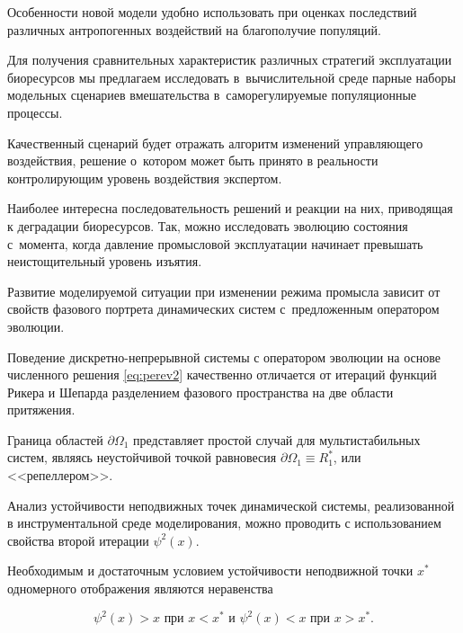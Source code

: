\smallskip




Особенности новой модели удобно использовать при оценках последствий различных антропогенных воздействий на благополучие популяций. 

Для получения сравнительных характеристик различных стратегий эксплуатации биоресурсов мы предлагаем исследовать в~вычислительной среде парные наборы модельных сценариев вмешательства в~саморегулируемые популяционные процессы. 

Качественный сценарий будет отражать алгоритм изменений управляющего воздействия, решение о~котором может быть принято в реальности контролирующим уровень воздействия экспертом.







Наиболее интересна последовательность решений и реакции на них, приводящая к деградации биоресурсов. Так, можно исследовать эволюцию состояния с~момента, когда давление промысловой эксплуатации начинает превышать неистощительный уровень изъятия.

Развитие моделируемой ситуации при изменении режима промысла зависит от свойств фазового портрета динамических систем с~предложенным оператором эволюции.



Поведение дискретно-непрерывной системы с оператором эволюции на основе численного решения \eqref{eq:perev2} качественно отличается от итераций функций Рикера и Шепарда разделением фазового пространства на две области притяжения. 

Граница областей $\partial\Omega_1$ представляет простой случай для мультистабильных систем, являясь неустойчивой точкой равновесия $\partial\Omega_1\equiv R_1^*$, или <<репеллером>>. 

Анализ устойчивости неподвижных точек динамической системы, реализованной в инструментальной среде моделирования, можно проводить с использованием свойства второй итерации $\psi ^2(x)$. 

Необходимым и достаточным условием устойчивости неподвижной точки $x^*$ одномерного отображения являются неравенства

$$\psi ^2(x)>x\text{ при } x<x^*\text{ и } \psi ^2(x)<x\text{ при } x>x^*.$$








